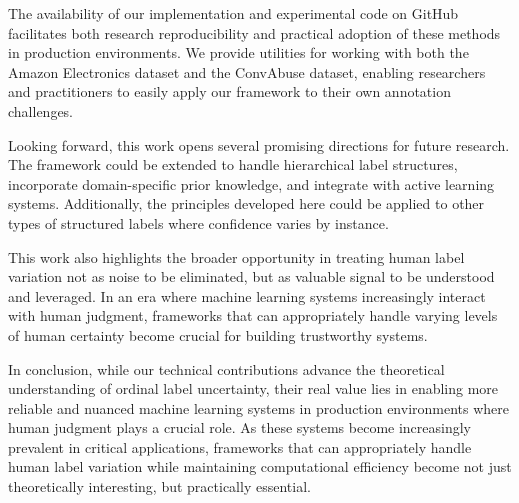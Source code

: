 \documentclass[journal]{IEEEtran}
\begin{document}
The availability of our implementation and experimental code on GitHub facilitates both research reproducibility and practical adoption of these methods in production environments. We provide utilities for working with both the Amazon Electronics dataset and the ConvAbuse dataset, enabling researchers and practitioners to easily apply our framework to their own annotation challenges.

Looking forward, this work opens several promising directions for future research. The framework could be extended to handle hierarchical label structures, incorporate domain-specific prior knowledge, and integrate with active learning systems. Additionally, the principles developed here could be applied to other types of structured labels where confidence varies by instance.

This work also highlights the broader opportunity in treating human label variation not as noise to be eliminated, but as valuable signal to be understood and leveraged. In an era where machine learning systems increasingly interact with human judgment, frameworks that can appropriately handle varying levels of human certainty become crucial for building trustworthy systems.

In conclusion, while our technical contributions advance the theoretical understanding of ordinal label uncertainty, their real value lies in enabling more reliable and nuanced machine learning systems in production environments where human judgment plays a crucial role. As these systems become increasingly prevalent in critical applications, frameworks that can appropriately handle human label variation while maintaining computational efficiency become not just theoretically interesting, but practically essential.



\end{document}
